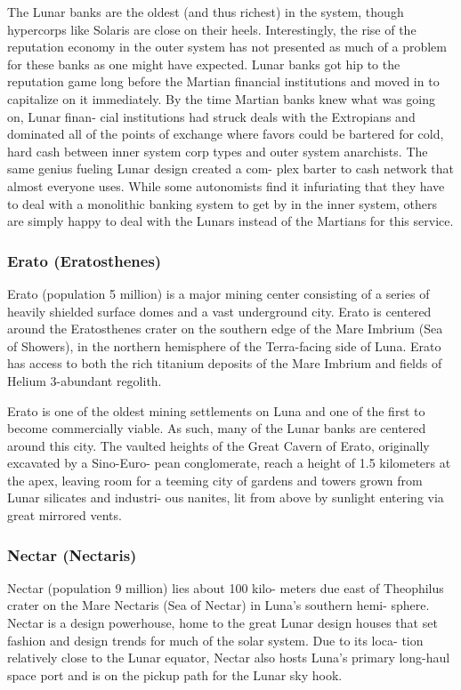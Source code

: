 The Lunar banks are the oldest (and thus richest) in 
the system, though hypercorps like Solaris are close 
on their heels. Interestingly, the rise of the reputation 
economy in the outer system has not presented as 
much of a problem for these banks as one might have 
expected. Lunar banks got hip to the reputation game 
long before the Martian financial institutions and 
moved in to capitalize on it immediately. By the time 
Martian banks knew what was going on, Lunar finan-
cial institutions had struck deals with the Extropians 
and dominated all of the points of exchange where 
favors could be bartered for cold, hard cash between 
inner system corp types and outer system anarchists. 
The same genius fueling Lunar design created a com-
plex barter to cash network that almost everyone 
uses. While some autonomists find it infuriating that 
they have to deal with a monolithic banking system 
to get by in the inner system, others are simply happy 
to deal with the Lunars instead of the Martians for 
this service.

\subsubsection{Erato (Eratosthenes)}

Erato (population 5 million) is a major mining center 
consisting of a series of heavily shielded surface domes 
and a vast underground city. Erato is centered around 
the Eratosthenes crater on the southern edge of the 
Mare Imbrium (Sea of Showers), in the northern 
hemisphere of the Terra-facing side of Luna. Erato has 
access to both the rich titanium deposits of the Mare 
Imbrium and fields of Helium 3-abundant regolith.

Erato is one of the oldest mining settlements on 
Luna and one of the first to become commercially 
viable. As such, many of the Lunar banks are centered 
around this city. The vaulted heights of the Great 
Cavern of Erato, originally excavated by a Sino-Euro-
pean conglomerate, reach a height of 1.5 kilometers at 
the apex, leaving room for a teeming city of gardens 
and towers grown from Lunar silicates and industri-
ous nanites, lit from above by sunlight entering via 
great mirrored vents.

\subsubsection{Nectar (Nectaris)}

Nectar (population 9 million) lies about 100 kilo-
meters due east of Theophilus crater on the Mare 
Nectaris (Sea of Nectar) in Luna's southern hemi-
sphere. Nectar is a design powerhouse, home to the 
great Lunar design houses that set fashion and design 
trends for much of the solar system. Due to its loca-
tion relatively close to the Lunar equator, Nectar also 
hosts Luna's primary long-haul space port and is on 
the pickup path for the Lunar sky hook.

